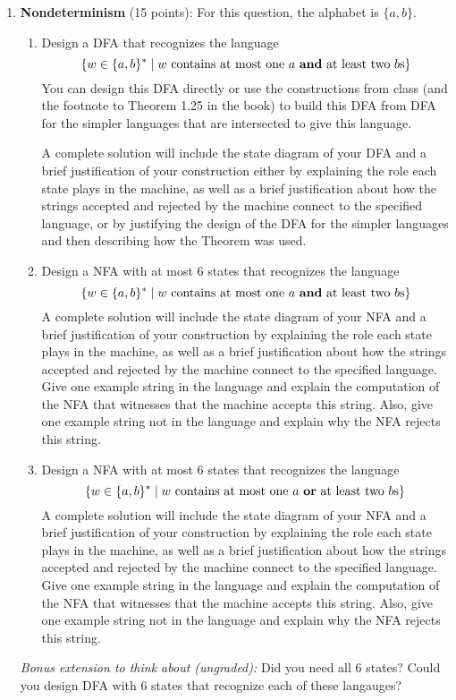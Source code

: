\begin{enumerate}[wide, labelwidth=!, labelindent=0pt]
\item \textbf{Nondeterminism} (15 points): For this question, the alphabet is $\{a,b\}$.
\begin{enumerate}
\item\gradeComplete Design a DFA that recognizes the language
    \[ 
    \{w \in \{a,b\}^* \mid w \text{ contains at most one $a$ {\bf and} at least two $b$s}\}
    \]
    You can design this DFA directly or use the constructions from class (and the footnote to Theorem 
    1.25 in the book) to build this DFA from DFA for the simpler languages that are intersected
    to give this language.
    
    A complete solution will include the state diagram of your DFA and 
    a brief justification 
    of your construction either by explaining the role each state plays in the machine, as well as a brief 
    justification about how the strings accepted and rejected by the machine connect to the specified language, 
    or by justifying the design of the DFA for the simpler languages and then describing how the Theorem was used.


    \item\gradeCorrect Design a NFA with at most $6$ states that recognizes the language
\[ 
\{w \in \{a,b\}^* \mid w \text{ contains at most one $a$ {\bf and} at least two $b$s}\}
\]
A complete solution will include the state diagram of your NFA and 
    a brief justification 
    of your construction by explaining the role each state plays in the machine, as well as a brief 
    justification about how the strings accepted and rejected by the machine connect to the specified language.
    Give one example string in the language and explain the computation of the NFA
    that witnesses that the machine accepts this string.
    Also, give one example string not in the language and explain why the NFA rejects this string.

\item\gradeCorrect Design a NFA with at most $6$ states that recognizes the language
\[ 
\{w \in \{a,b\}^* \mid w \text{ contains at most one $a$ {\bf or} at least two $b$s}\}
\]
A complete solution will include the state diagram of your NFA and 
    a brief justification 
    of your construction by explaining the role each state plays in the machine, as well as a brief 
    justification about how the strings accepted and rejected by the machine connect to the specified language.
    Give one example string in the language and explain the computation of the NFA
    that witnesses that the machine accepts this string.
    Also, give one example string not in the language and explain why the NFA rejects this string.
\end{enumerate}
{\it Bonus extension to think about (ungraded):} Did you need all $6$ states? Could you design DFA with $6$ states that recognize
each of these langauges?


\end{enumerate}
